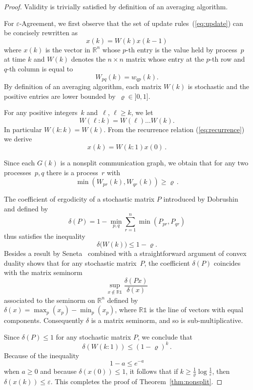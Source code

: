 \documentclass[a4paper]{article}
\theoremstyle{newthm}
\newcommand{\IR}{\mathds{R}}
\renewcommand{\leq}{\leqslant}
\renewcommand{\ge}{\geqslant}
\renewcommand{\geq}{\geqslant}
\newcommand{\one}{\mathds{1}}
\begin{document}
\begin{proof}
Validity is trivially satisfied by definition of an averaging algorithm.

For $\varepsilon$-Agreement, we first observe that the set of update rules~(\ref{eq:update}) can be concisely rewritten as 
	\begin{equation}\label{eq:recurrence}
	x(k) = W(k) x(k-1) 
	\end{equation}
	where $x(k)$ is the vector in $\IR^n$ whose $p$-th entry is the value held by process~$p$
	at time $k$ and $W(k)$ denotes the $n \times n$ matrix whose entry at the $p$-th row and $q$-th
	column is equal to 
	$$W_{p q}(k) = w_{q p}(k) .$$
By definition of an averaging algorithm, each matrix $W(k)$ is stochastic and
	 the positive entries are lower bounded by~$\varrho \in ]0,1]$. 


	
For any positive integers~$k$ and~$\ell$, $\ell  \geq k$, we let 
	$$W(\ell : k )= W(\ell)\dots W(k) .$$
In particular  $W(k : k )=  W(k) $. 
From the recurrence relation (\ref{eq:recurrence}) we derive 
	\begin{equation}\label{eq:expression}
	x(k) = W(k:1)x(0) \, .
	\end{equation}

Since each $G(k)$ is a nonsplit communication graph, we obtain that
     for any two processes~$p,q$ there is a process~$r$ with  
$$ \min (W_{p r}(k), W_{q r}(k)) \ge \varrho \,.$$


The coefficient of ergodicity of a stochastic matrix $P$ introduced by Dobrushin~\cite{Dob56}
	and defined by 
	$$\delta(P) = 1- \min_{p,q} \sum^n_{r=1} \min (P_{p r}, P_{q r}) $$
	thus satisfies the inequality 
	\begin{equation}\label{eq:normC}
	\delta \big( W(k) \big)  \leq 1 - \varrho .
	\end{equation}
Besides a result by Seneta~\cite{Sen79} combined with a straightforward argument of convex duality shows 
	that for any stochastic matrix~$P$, the coefficient $\delta(P)$ coincides with the matrix seminorm 
	 $$ \sup _{x\notin \IR \one}  \frac{ \delta (Px) } {\delta(x)} $$
	 associated to  the seminorm on $\IR^n$ defined by
	$\delta(x)= \max_{p} (x_p) - \min_{p} (x_p) $, where $ \IR \one$ is the line
	of vectors with equal components.
Consequently $\delta$ is a matrix seminorm, and so is sub-multiplicative.

Since  $\delta(P) \leq 1$ for any stochastic matrix $P$, we conclude that
	$$ \delta \left( W( k:1)\right) \leq \left (1 - \varrho \right)^{k} \, .$$
Because of the inequality $$ 1-a \leq e^{-a}$$  when 
	$a \geq 0$  and
	because $ \delta \left( x(0 )\right) \leq 1$, it follows that 
		if $k \geq \frac{1 }{\varrho} \log \frac{1}{\varepsilon}$,
		then $ \delta \left( x(k)\right) \leq\varepsilon$.
This completes the proof of Theorem~\ref{thm:nonsplit}.
\end{proof}
\end{document}
